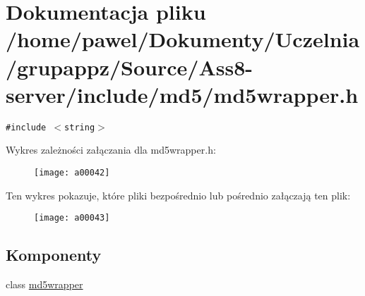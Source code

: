 \hypertarget{a00012}{
\section{Dokumentacja pliku /home/pawel/Dokumenty/Uczelnia/grupappz/Source/Ass8-server/include/md5/md5wrapper.h}
\label{a00012}
}
{\tt \#include $<$string$>$}\par


Wykres zależności załączania dla md5wrapper.h:\nopagebreak
\begin{figure}[H]
\begin{center}
\leavevmode
\texttt{[image: a00042]}
\end{center}
\end{figure}


Ten wykres pokazuje, które pliki bezpośrednio lub pośrednio załączają ten plik:\nopagebreak
\begin{figure}[H]
\begin{center}
\leavevmode
\texttt{[image: a00043]}
\end{center}
\end{figure}
\subsection*{Komponenty}
\begin{CompactItemize}
\item 
class \hyperlink{a00004}{md5wrapper}
\end{CompactItemize}
